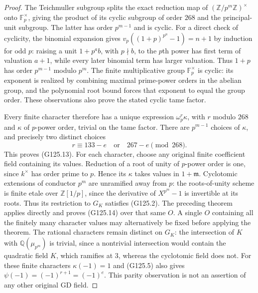 \begin{proof}
The Teichmuller subgroup splits the exact reduction map of
\((\mathbb Z/p^m\mathbb Z)^\times\) onto
\(\mathbb F_p^\times\), giving the product of its cyclic
subgroup of order \(268\) and the principal-unit subgroup.
The latter has order \(p^{m-1}\) and is cyclic.  For a
direct check of cyclicity, the binomial expansion gives
\(v_p((1+p)^{p^n}-1)=n+1\) by induction for odd \(p\):
raising a unit \(1+p^a b\), with \(p\nmid b\), to the
\(p\)th power has first term of valuation \(a+1\),
while every later binomial term has larger valuation.
Thus \(1+p\) has order \(p^{m-1}\) modulo \(p^m\).
The finite multiplicative group \(\mathbb F_p^\times\)
is cyclic: its exponent is realized by combining maximal
prime-power orders in the abelian group, and the polynomial
root bound forces that exponent to equal the group order.
These observations also prove the stated cyclic tame factor.

Every finite character therefore has a unique expression
\(\omega_p^r\kappa\), with \(r\) modulo \(268\) and
\(\kappa\) of \(p\)-power order, trivial on the tame factor.
There are \(p^{m-1}\) choices of \(\kappa\), and precisely
two distinct choices
\[
                    r\equiv133-e\quad\text{or}\quad267-e
                                \pmod{268}.
 \tag{G125.15}
\]
This proves (G125.13).  For each character, choose any original
finite coefficient field containing its values.  Reduction of
a root of unity of \(p\)-power order is one, since \(k^\times\)
has order prime to \(p\).  Hence its \(\kappa\) takes values
in \(1+\mathfrak m\).  Cyclotomic extensions of conductor
\(p^m\) are unramified away from \(p\): the roots-of-unity
scheme is finite etale over \(\mathbb Z[1/p]\), since the
derivative of \(X^{p^m}-1\) is invertible at its roots.
Thus its restriction
to \(G_K\) satisfies (G125.2).  The preceding theorem
applies directly and proves (G125.14) over that same \(O\).
A single \(O\) containing all the finitely many character
values may alternatively be fixed before applying the theorem.
The rational characters remain distinct on \(G_K\): the
intersection of \(K\) with \(\mathbb Q(\mu_{p^m})\) is
trivial, since a nontrivial intersection would contain the
quadratic field \(K\), which ramifies at \(3\), whereas the
cyclotomic field does not.  For these finite characters
\(\kappa(-1)=1\) and (G125.5) also gives
\(\psi(-1)=(-1)^{r+1}=(-1)^e\).  This parity observation
is not an assertion of any other original \(\mathrm{GD}\) field.
\end{proof}

